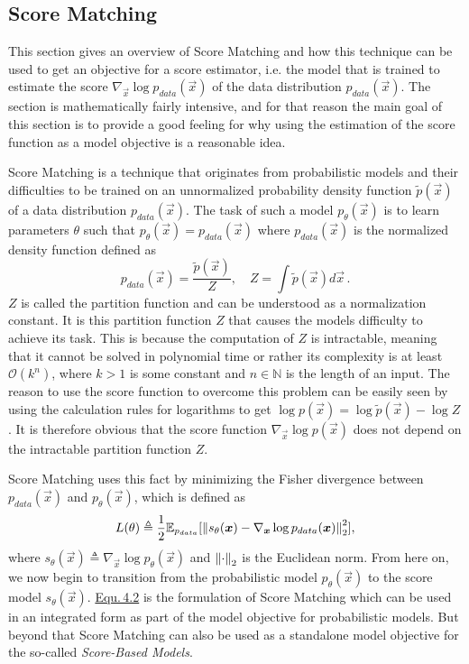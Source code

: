 \subsection{Score Matching} \label{sec:4.1.1}
This section gives an overview of Score Matching and how this technique can be used to get an objective for a score estimator, i.e. the model that is trained to estimate the score $\nabla_{\vec{x}}\log p_{data}(\vec{x})$ of the data distribution $p_{data}(\vec{x})$. The section is mathematically fairly intensive, and for that reason the main goal of this section is to provide a good feeling for why using the estimation of the score function as a model objective is a reasonable idea.

Score Matching \cite{score_matching_original} is a technique that originates from probabilistic models and their difficulties to be trained on an unnormalized probability density function $\tilde{p}(\vec{x})$ of a data distribution $p_{data}(\vec{x})$. The task of such a model $p_\theta(\vec{x})$ is to learn parameters $\theta$ such that $p_\theta(\vec{x})=p_{data}(\vec{x})$ where $p_{data}(\vec{x})$ is the normalized density function defined as
%
\begin{equation}
    p_{data}(\vec{x})=\frac{\tilde{p}(\vec{x})}{Z},\quad Z=\int\tilde{p}(\vec{x})d\vec{x}\,.
\end{equation}
%
$Z$ is called the partition function and can be understood as a normalization constant. It is this partition function $Z$ that causes the models difficulty to achieve its task. This is because the computation of $Z$ is intractable, meaning that it cannot be solved in polynomial time or rather its complexity is at least $\mathcal{O}(k^n)$, where $k>1$ is some constant and $n\in\mathbb{N}$ is the length of an input. The reason to use the score function to overcome this problem can be easily seen by using the calculation rules for logarithms to get $\log p(\vec{x})=\log\tilde{p}(\vec{x})-\log Z$. It is therefore obvious that the score function $\nabla_{\vec{x}}\log p(\vec{x})$ does not depend on the intractable partition function $Z$.

Score Matching uses this fact by minimizing the Fisher divergence between $p_{data}(\vec{x})$ and $p_\theta(\vec{x})$, which is defined as
%
\begin{equation} \label{equ:4.2}
    L(\theta)\triangleq\frac{1}{2}\mathbb{E}_{p_{data}}[\left\lVert s_\theta(\boldsymbol{x})-\nabla_{\boldsymbol{x}}\log p_{data}(\boldsymbol{x})\right\rVert^2_2],
\end{equation}
%
where $s_\theta(\vec{x})\triangleq\nabla_{\vec{x}}\log p_\theta(\vec{x})$ and $\left\lVert\cdot\right\rVert_2$ is the Euclidean norm. From here on, we now begin to transition from the probabilistic model $p_\theta(\vec{x})$ to the score model $s_\theta(\vec{x})$. \hyperref[equ:4.2]{Equ.\,4.2} is the formulation of Score Matching which can be used in an integrated form as part of the model objective for probabilistic models. But beyond that Score Matching can also be used as a standalone model objective for the so-called \textit{Score-Based Models}.

